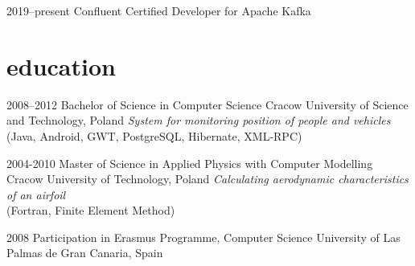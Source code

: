\documentclass[]{gaza-cv} %
\begin{document}
\begin{entrylist}

\entry
{2019--present}
{Confluent Certified Developer for Apache Kafka}


\end{entrylist}



\section{education}

\begin{entrylist}

\entry
{2008--2012}
{Bachelor of Science {\normalfont in Computer Science}}
{Cracow University of Science and Technology, Poland}
{\emph{System for monitoring position of people and vehicles} \\(Java, Android, GWT, PostgreSQL, Hibernate, XML-RPC)}


\entry
{2004-2010}
{Master of Science {\normalfont in Applied Physics with Computer Modelling}}
{Cracow University of Technology, Poland}
{\emph{Calculating aerodynamic characteristics of an airfoil} \\(Fortran, Finite Element Method)}



\entry
{2008}
{Participation in Erasmus Programme, {\normalfont Computer Science}}
{University of Las Palmas de Gran Canaria, Spain}
{}

\end{entrylist}
\end{document}

